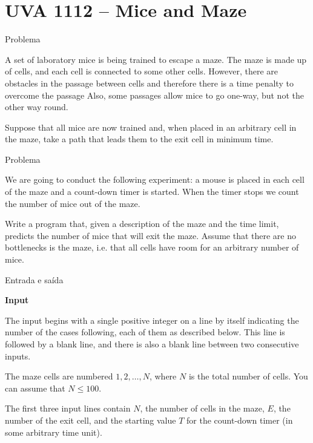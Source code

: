 \section{UVA 1112 -- Mice and Maze}

\begin{frame}[fragile]{Problema}

A set of laboratory mice is being trained to escape a maze. The maze is made up of cells, and each 
cell is connected to some other cells. However, there are obstacles in the passage between cells 
and therefore there is a time penalty to overcome the passage Also, some passages allow mice to go 
one-way, but not the other way round.

Suppose that all mice are now trained and, when placed in an arbitrary cell in the maze, take a
path that leads them to the exit cell in minimum time.

\end{frame}

\begin{frame}[fragile]{Problema}

We are going to conduct the following experiment: a mouse is placed in each cell of the maze and
a count-down timer is started. When the timer stops we count the number of mice out of the maze.

Write a program that, given a description of the maze and the time limit, predicts the number of
mice that will exit the maze. Assume that there are no bottlenecks is the maze, i.e. that all 
cells have room for an arbitrary number of mice.

\end{frame}

\begin{frame}[fragile]{Entrada e saída}

\textbf{Input}

The input begins with a single positive integer on a line by itself indicating the number of the 
cases following, each of them as described below. This line is followed by a blank line, and there 
is also a blank line between two consecutive inputs.

The maze cells are numbered $1, 2, \ldots, N$, where $N$ is the total number of cells. You can 
assume that $N\leq 100$.

The first three input lines contain $N$, the number of cells in the maze, $E$, the number of the 
exit cell, and the starting value $T$ for the count-down timer (in some arbitrary time unit).

\end{frame}

